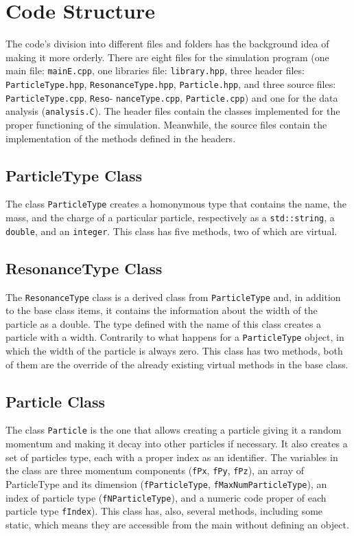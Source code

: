 \documentclass[a4paper, 11pt]{article}
\begin{document}
    \section{Code Structure}
      The code's division into different files and folders has the background idea of making it more orderly. There are eight files for the simulation program (one main file: \verb|mainE.cpp|, one libraries file: \verb|library.hpp|, three header files: \verb|ParticleType.hpp|, \verb|ResonanceType.hpp|, \verb|Particle.hpp|, and three source files: \verb|ParticleType.cpp|, \verb|Reso|- \verb|nanceType.cpp|, \verb|Particle.cpp|) and one for the data analysis (\verb|analysis.C|).
      The header files contain the classes implemented for the proper functioning of the simulation. Meanwhile, the source files contain the implementation of the methods defined in the headers.
      \subsection*{ParticleType Class}
      The class \verb|ParticleType| creates a homonymous type that contains the name, the mass, and the charge of a particular particle, respectively as a \verb|std::string|, a \verb|double|, and an \verb|integer|. This class has five methods, two of which are virtual.
      \subsection* {ResonanceType Class}
      The \verb|ResonanceType| class is a derived class from \verb|ParticleType| and, in addition to the base class items, it contains the information about the width of the particle as a double. The type defined with the name of this class creates a particle with a width. Contrarily to what happens for a \verb|ParticleType| object, in which the width of the particle is always zero. This class has two methods, both of them are the override of the already existing virtual methods in the base class.
      \subsection* {Particle Class}
      The class \verb|Particle| is the one that allows creating a particle giving it a random momentum and making it decay into other particles if necessary. It also creates a set of particles type, each with a proper index as an identifier. The variables in the class are three momentum components (\verb|fPx|, \verb|fPy|, \verb|fPz|), an array of ParticleType and its dimension (\verb|fParticleType|, \verb|fMaxNumParticleType|), an index of particle type (\verb|fNParticleType|), and a numeric code proper of each particle type \verb|fIndex|). This class has, also, several methods, including some static, which means they are accessible from the main without defining an object.
\end{document}
